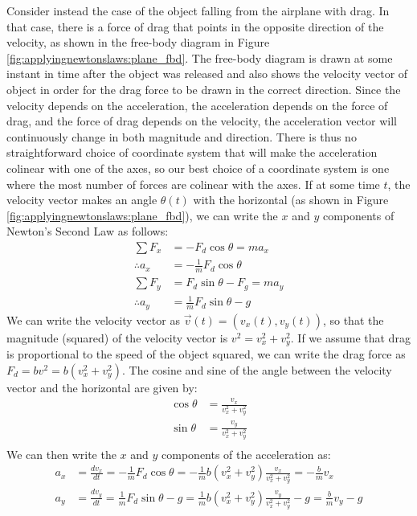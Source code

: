 Consider instead the case of the object falling from the airplane with drag. In that case, there is a force of drag that points in the opposite direction of the velocity, as shown in the free-body diagram in Figure \ref{fig:applyingnewtonslaws:plane_fbd}. The free-body diagram is drawn at some instant in time after the object was released and also shows the velocity vector of object in order for the drag force to be drawn in the correct direction. 
Since the velocity depends on the acceleration, the acceleration depends on the force of drag, and the force of drag depends on the velocity, the acceleration vector will continuously change in both magnitude and direction. There is thus no straightforward choice of coordinate system that will make the acceleration colinear with one of the axes, so our best choice of a coordinate system is one where the most number of forces are colinear with the axes. If at some time $t$, the velocity vector makes an angle $\theta(t)$ with the horizontal (as shown in Figure \ref{fig:applyingnewtonslaws:plane_fbd}), we can write the $x$ and $y$ components of Newton's Second Law as follows:
\begin{align*}
\sum F_x &= -F_d\cos\theta = ma_x \\
\therefore a_x &= -\frac{1}{m}F_d\cos\theta\\
\sum F_y &= F_d\sin\theta-F_g = ma_y \\
\therefore a_y &= \frac{1}{m}F_d\sin\theta-g
\end{align*}
We can write the velocity vector as $\vec v(t) = (v_x(t), v_y(t))$, so that the magnitude (squared) of the velocity vector is $v^2=v_x^2+v_y^2$. If we assume that drag is proportional to the speed of the object squared, we can write the drag force as $F_d = bv^2=b(v_x^2+v_y^2)$. The cosine and sine of the angle between the velocity vector and the horizontal are given by:
\begin{align*}
\cos\theta &= \frac{v_x}{v_x^2+v_y^2}\\
\sin\theta &= \frac{v_y}{v_x^2+v_y^2}\\
\end{align*}
We can then write the $x$ and $y$ components of the acceleration as:
\begin{align*}
a_x&=\frac{dv_x}{dt}=-\frac{1}{m}F_d\cos\theta=-\frac{1}{m}b(v_x^2+v_y^2)\frac{v_x}{v_x^2+v_y^2}=-\frac{b}{m}v_x\\
a_y&=\frac{dv_y}{dt}=\frac{1}{m}F_d\sin\theta-g=\frac{1}{m}b(v_x^2+v_y^2)\frac{v_y}{v_x^2+v_y^2}-g=\frac{b}{m}v_y-g\\
\end{align*}
